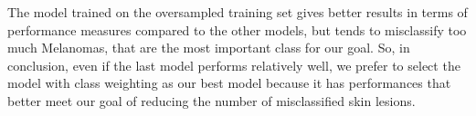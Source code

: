 		The model trained on the oversampled training set gives better results in terms of performance measures compared to the other models, but tends to misclassify too much Melanomas, that are the most important class for our goal.
		So, in conclusion, even if the last model performs relatively well, we prefer to select the model with class weighting as our best model because it has performances that better meet our goal of reducing the number of misclassified skin lesions.
		
		
		
		
		